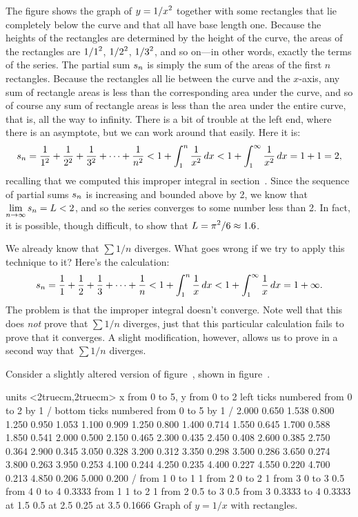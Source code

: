 The figure shows the graph of $\displaystyle y=1/x^2$ together with some rectangles
that lie completely below the curve and that all have base length
one. Because the heights of the rectangles are determined by the
height of the curve, the areas of the rectangles are $\displaystyle 1/1^2$, $\displaystyle 1/2^2$,
$\displaystyle 1/3^2$, and so on---in other words, exactly the terms of the
series. The partial sum $\displaystyle s_n$ is simply the sum of the areas of the
first $n$ rectangles. Because the rectangles all lie between the curve
and the $x$-axis, any sum of rectangle areas is less than the
corresponding area under the curve, and so of course any sum of
rectangle areas is less than the area under the entire curve, that is,
all the way to infinity.
There is a bit of trouble at the
left end, where there is an asymptote, but we can work around that
easily. Here it is:
$$
  s_n={1\over 1^2}+{1\over 2^2}+{1\over 3^2}+\cdots+{1\over n^2}
  < 1 + \int_1^n {1\over x^2}\,dx < 1+\int_1^\infty {1\over x^2}\,dx 
  =1+1=2,
$$
recalling that we computed this improper integral in 
section~. Since the sequence of partial
sums $\displaystyle s_n$ is increasing and bounded above by 2, we know that 
$\displaystyle\lim_{n\to\infty}s_n=L<2$, and so the series converges to some
number less than 2. In fact, it is possible, though difficult, to show
that $\displaystyle L=\pi^2/6\approx 1.6$.
\endexample

We already know that $\sum 1/n$ diverges. What goes wrong if we try to
apply this technique to it? Here's the calculation:
$$
  s_n={1\over 1}+{1\over 2}+{1\over 3}+\cdots+{1\over n}
  < 1 + \int_1^n {1\over x}\,dx < 1+\int_1^\infty {1\over x}\,dx 
  =1+\infty.
$$
The problem is that the improper integral doesn't converge. Note well
that this does {\em not\/} prove that $\sum 1/n$ diverges, just that
this particular calculation fails to prove that it converges. A slight
modification, however, allows us to prove in a second way that $\sum
1/n$ diverges. 

\example Consider a slightly altered version of figure~, shown in figure~.

\figure
\texonly
\vbox{\beginpicture
\normalgraphs
\ninepoint
\setcoordinatesystem units <2truecm,2truecm>
\setplotarea x from 0 to 5, y from 0 to 2
\axis left ticks numbered from 0 to 2 by 1 /
\axis bottom  ticks numbered from 0 to 5 by 1 /
\setquadratic
{} 2.000 0.650 1.538 0.800 1.250 0.950 1.053 1.100 0.909 
1.250 0.800 1.400 0.714 1.550 0.645 1.700 0.588 1.850 0.541 
2.000 0.500 2.150 0.465 2.300 0.435 2.450 0.408 2.600 0.385 
2.750 0.364 2.900 0.345 3.050 0.328 3.200 0.312 3.350 0.298 
3.500 0.286 3.650 0.274 3.800 0.263 3.950 0.253 4.100 0.244 
4.250 0.235 4.400 0.227 4.550 0.220 4.700 0.213 4.850 0.206 
5.000 0.200 /
\putrule from 1 0 to 1 1 
\putrule from 2 0 to 2 1
\putrule from 3 0 to 3 0.5
\putrule from 4 0 to 4 0.3333
\putrule from 1 1 to 2 1
\putrule from 2 0.5 to 3 0.5
\putrule from 3 0.3333 to 4 0.3333
\sevenpoint
{} at 1.5 0.5
 at 2.5 0.25
 at 3.5 0.1666
\endpicture}
\endtexonly
{}
\begincaption
Graph of $y=1/x$ with rectangles.
\endcaption
\endfigure

